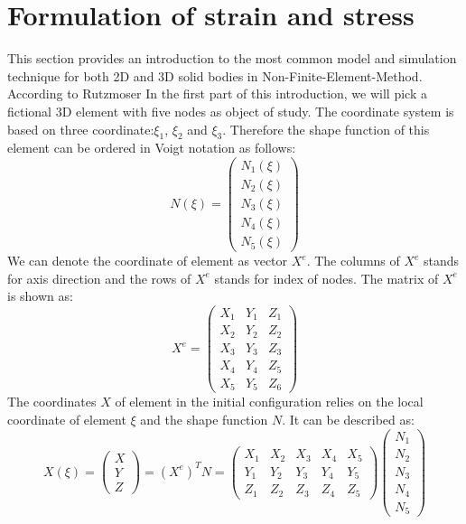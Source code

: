 \section{Formulation of strain and stress}
This section provides an introduction to the most common model and simulation technique for both 2D and 3D solid bodies in Non-Finite-Element-Method. According to Rutzmoser \cite{Johannes} In the first part of this introduction, we will pick a fictional 3D element with five nodes as object of study. The coordinate system is based on three coordinate:$\xi_1$, $\xi_2$ and $\xi_3$. Therefore the shape function of this element can be ordered in Voigt notation as follows:
\begin{equation}
 N\left(\xi\right) = \begin{pmatrix}
 N_1\left(\xi\right)           \\[0.3em]
 N_2\left(\xi\right)            \\[0.3em]
 N_3\left(\xi\right)           \\[0.3em]
 N_4\left(\xi\right)         \\[0.3em]
 N_5\left(\xi\right)                            
\end{pmatrix}
\end{equation}
We can denote the coordinate of element as vector $X^e$. The columns of $X^e$ stands for axis direction and the rows of $X^e$ stands for index of nodes. The matrix of $X^e$ is shown as:
\begin{equation}
X^e = \begin{pmatrix}
X_1 & Y_1 & Z_1           \\[0.3em]
X_2 & Y_2 & Z_2             \\[0.3em]
X_3 & Y_3 & Z_3           \\[0.3em]
X_4 & Y_4 & Z_5          \\[0.3em]
X_5 & Y_5 & Z_6                            
\end{pmatrix}
\end{equation}	
The coordinates $X$ of element in the initial configuration relies on the local coordinate of element $\xi$ and the shape function $N$. It can be described as:
\begin{equation}
X\left(\xi\right) = \begin{pmatrix}
X \\
Y \\
Z
\end{pmatrix} = \left(X^e\right)^T N = \begin{pmatrix}
X_1 & X_2 & X_3 & X_4 & X_5 \\
Y_1 & Y_2 & Y_3 & Y_4 & Y_5 \\
Z_1 & Z_2 & Z_3 & Z_4 & Z_5
\end{pmatrix} \begin{pmatrix}
N_1 \\
N_2 \\
N_3 \\
N_4 \\
N_5 
\end{pmatrix}
\end{equation} 
